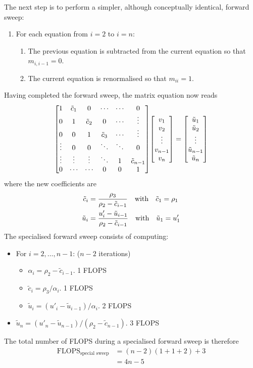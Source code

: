\documentclass[reprint,english]{revtex4-1}
\begin{document}
\newpage
The next step is to perform a simpler, although conceptually identical, forward sweep:
\begin{enumerate}
\item[] For each equation from \(i=2\) to \(i=n\):
\begin{enumerate}
	\item The previous equation is subtracted from the current equation so that \(m_{i,i-1}=0\).
	\item The current equation is renormalised so that \(m_{ii}=1\).
\end{enumerate}
\end{enumerate}
Having completed the forward sweep, the matrix equation now reads
\[\mqty[1 & \tilde{c}_1 & 0 & \cdots & \cdots & 0 \\
0 & 1 & \tilde{c}_2 & 0 & \cdots & \vdots \\
0 & 0 & 1 & \tilde{c}_3 & \cdots & \vdots \\
\vdots & 0 & 0 & \ddots & \ddots & 0 \\
\vdots & \vdots & \vdots & \ddots & 1 & \tilde{c}_{n-1} \\
0 & \cdots & \cdots & 0 & 0 & 1]\mqty[v_1 \\ v_2 \\ \vdots \\ v_{n-1} \\ v_n]=\mqty[\tilde{u}_1 \\ \tilde{u}_2 \\ \vdots \\ \tilde{u}_{n-1} \\ \tilde{u}_n]\]
where the new coefficients are
\begin{align}
\tilde{c}_i&=\frac{\rho_3}{\rho_2-\tilde{c}_{i-1}}\qq{with}\tilde{c}_1=\rho_1\\
\tilde{u}_i&=\frac{u'_i-\tilde{u}_{i-1}}{\rho_2-\tilde{c}_{i-1}}\qq{with}\tilde{u}_1=u'_1
\end{align}
\noindent The specialised forward sweep consists of computing:
\begin{itemize}
\renewcommand\labelitemi{\(\times\)}
\renewcommand\labelitemii{\(\to\)}
\item For \(i=2,\ldots,n-1\): (\(n-2\) iterations)
	\begin{itemize}
	\item \(\alpha_i=\rho_2-\tilde{c}_{i-1}\). 1 FLOPS
	\item \(\tilde{c}_i=\rho_3/\alpha_i\). 1 FLOPS
	\item \(\tilde{u}_i=(u'_i-\tilde{u}_{i-1})/\alpha_i\). 2 FLOPS
	\end{itemize}
\item \(\tilde{u}_n=(u'_n-\tilde{u}_{n-1})/(\rho_2-\tilde{c}_{n-1})\). 3 FLOPS
\end{itemize}
The total number of FLOPS during a specialised forward sweep is therefore
\begin{align}
\text{FLOPS}_{\text{special sweep}}&=(n-2)(1+1+2)+3\nonumber\\
&=4n-5
\end{align}
\end{document}
